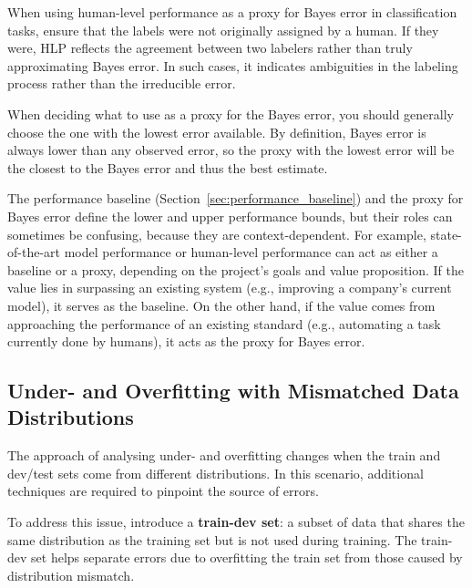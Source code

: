 \documentclass[12pt,openany]{book}
\begin{document}
\begin{notebox}
When using human-level performance as a proxy for Bayes error in classification tasks, ensure that the labels were not originally assigned by a human. If they were, HLP reflects the agreement between two labelers rather than truly approximating Bayes error. In such cases, it indicates ambiguities in the labeling process rather than the irreducible error.
\end{notebox}

\begin{notebox}
When deciding what to use as a proxy for the Bayes error, you should generally choose the one with the lowest error available. By definition, Bayes error is always lower than any observed error, so the proxy with the lowest error will be the closest to the Bayes error and thus the best estimate. 
\end{notebox}

\begin{notebox}
The performance baseline (Section~\ref{sec:performance_baseline}) and the proxy for Bayes error define the lower and upper performance bounds, but their roles can sometimes be confusing, because they are context-dependent. For example, state-of-the-art model performance or human-level performance can act as either a baseline or a proxy, depending on the project’s goals and value proposition. If the value lies in surpassing an existing system (e.g., improving a company’s current model), it serves as the baseline. On the other hand, if the value comes from approaching the performance of an existing standard (e.g., automating a task currently done by humans), it acts as the proxy for Bayes error.
\end{notebox}


\subsection{Under- and Overfitting with Mismatched Data Distributions}
The approach of analysing under- and overfitting changes when the train and dev/test sets come from different distributions. In this scenario, additional techniques are required to pinpoint the source of errors. \newline

To address this issue, introduce a \textbf{train-dev set}: a subset of data that shares the same distribution as the training set but is not used during training. The train-dev set helps separate errors due to overfitting the train set from those caused by distribution mismatch.
\end{document}
